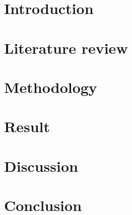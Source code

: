 \documentclass[12pt, a4paper]{article}
\begin{document}

\newpage

\newpage

\newpage

\newpage

\newpage
\tableofcontents
\newpage
\listoffigures
\newpage
\listoftables
\newpage

\newpage

\newpage

\newpage
{}
\section{Introduction}

\newpage
\section{Literature review}

\newpage
\section{Methodology}

\newpage
\section{Result}

\newpage
\section{Discussion}

\newpage
\section{Conclusion}

\newpage
{}

\end{document}

